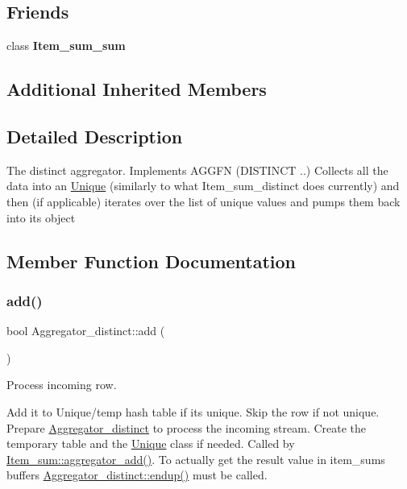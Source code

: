 \subsection*{Friends}
\begin{DoxyCompactItemize}
\item 
\mbox{\label{classAggregator__distinct_a2afeb7cbcc97ddd2c3c74cf87352e0ab}} 
class {\bfseries Item\+\_\+sum\+\_\+sum}
\end{DoxyCompactItemize}
\subsection*{Additional Inherited Members}


\subsection{Detailed Description}
The distinct aggregator. Implements A\+G\+G\+FN (D\+I\+S\+T\+I\+N\+CT ..) Collects all the data into an \mbox{\hyperlink{classUnique}{Unique}} (similarly to what Item\+\_\+sum\+\_\+distinct does currently) and then (if applicable) iterates over the list of unique values and pumps them back into its object 

\subsection{Member Function Documentation}
\mbox{\label{classAggregator__distinct_af72d7cc1082245015c41e99893992a4f}} 
\subsubsection{\texorpdfstring{add()}{add()}}
{\footnotesize\ttfamily bool Aggregator\+\_\+distinct\+::add (\begin{DoxyParamCaption}{ }\end{DoxyParamCaption})\hspace{0.3cm}{\ttfamily [virtual]}}

Process incoming row.

Add it to Unique/temp hash table if it\textquotesingle{}s unique. Skip the row if not unique. Prepare \mbox{\hyperlink{classAggregator__distinct}{Aggregator\+\_\+distinct}} to process the incoming stream. Create the temporary table and the \mbox{\hyperlink{classUnique}{Unique}} class if needed. Called by \mbox{\hyperlink{classItem__sum_ab090330ed58167234556e1f906976c0c}{Item\+\_\+sum\+::aggregator\+\_\+add()}}. To actually get the result value in item\+\_\+sum\textquotesingle{}s buffers \mbox{\hyperlink{classAggregator__distinct_a474d5f42f784572ea3b7d28be0fc3b2e}{Aggregator\+\_\+distinct\+::endup()}} must be called.

